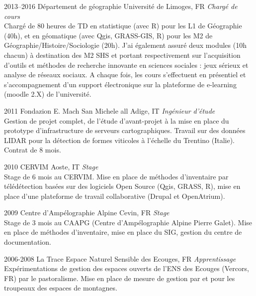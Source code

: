 \documentclass[]{cv-etienne}
\begin{document}
\begin{entrylist}
\entry
{2013--2016}
{Département de géographie}
{Université de Limoges, FR}
{\emph{Chargé de cours} \\
Chargé de 80 heures de TD en statistique (avec R) pour les L1 de Géographie (40h), et en géomatique (avec Qgis, GRASS-GIS, R) pour les M2 de Géographie/Histoire/Sociologie (20h). J'ai également assuré deux modules (10h chacun) à destination des M2 SHS et portant respectivement sur l’acquisition d’outils et méthodes de recherche innovante en sciences sociales : jeux sérieux et analyse de réseaux sociaux. A chaque fois, les cours s'effectuent en présentiel et s'accompagnement d'un support électronique sur la plateforme de e-learning (moodle 2.X) de l'université.
}
\end{entrylist}
\begin{entrylist}
\entry
{2011}
{Fondazion E. Mach}
{San Michele all Adige, IT}
{\emph{Ingénieur d'étude}\\
Gestion de projet complet, de l'étude d'avant-projet à la mise en place du prototype d'infrastructure de serveurs cartographiques. Travail sur des données LIDAR pour la détection de formes viticoles à l'échelle du Trentino (Italie). Contrat de 8 mois.
}
\end{entrylist}
\begin{entrylist}
\entry
{2010}
{CERVIM}
{Aoste, IT}
{\emph{Stage}\\
Stage de 6 mois au CERVIM. Mise en place de méthodes d'inventaire par télédétection basées sur des logiciels Open Source (Qgis, GRASS, R), mise en place d’une plateforme de travail collaborative (Drupal et OpenAtrium).
}
\end{entrylist}
\begin{entrylist}
\entry
{2009}
{Centre d'Ampélographie Alpine}
{Cevin, FR}
{\emph{Stage}\\
Stage de 3 mois au CAAPG (Centre d'Ampélographie Alpine Pierre Galet). Mise en place de méthodes d'inventaire, mise en place du SIG, gestion du centre de documentation.
}
\end{entrylist}
\begin{entrylist}
\entry
{2006-2008}
{La Trace}
{Espace Naturel Sensible des Ecouges, FR}
{\emph{Apprentissage}\\
Expérimentations de gestion des espaces ouverts de l'ENS des Ecouges (Vercors, FR) par le pastoralisme. Mise en place de mesure de gestion par et pour les troupeaux des espaces de montagnes.
}
\end{entrylist}
\end{document}
